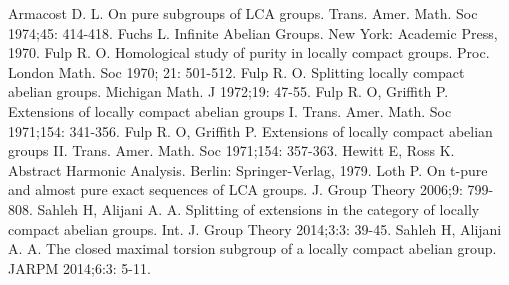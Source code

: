 \documentclass{amsart}
\theoremstyle{definition}
\theoremstyle{remark}
\numberwithin{equation}{section}
\begin{document}

\begin{thebibliography}{90}

Armacost D. L. On pure subgroups of LCA groups. Trans. Amer. Math. Soc 1974;45: 414-418.
Fuchs L. Infinite Abelian Groups. New York: Academic Press, 1970.
Fulp R. O. Homological study of purity in locally compact groups. Proc. London Math. Soc 1970; 21: 501-512.
Fulp R. O. Splitting locally compact abelian groups. Michigan Math. J 1972;19: 47-55.
Fulp R. O, Griffith P. Extensions of locally compact abelian groups I. Trans. Amer. Math. Soc 1971;154: 341-356.
Fulp R. O, Griffith P. Extensions of locally compact abelian groups II. Trans. Amer. Math. Soc 1971;154: 357-363.
Hewitt E, Ross K. Abstract Harmonic Analysis. Berlin: Springer-Verlag, 1979.
Loth P. On t-pure and almost pure exact sequences of LCA groups. J. Group Theory 2006;9: 799-808.
Sahleh H, Alijani A. A. Splitting of extensions in the category of locally compact abelian groups. Int. J. Group Theory 2014;3:3: 39-45.
Sahleh H, Alijani A. A. The closed maximal torsion subgroup of a locally compact abelian group. JARPM 2014;6:3: 5-11.

\end{thebibliography}
\end{document}
